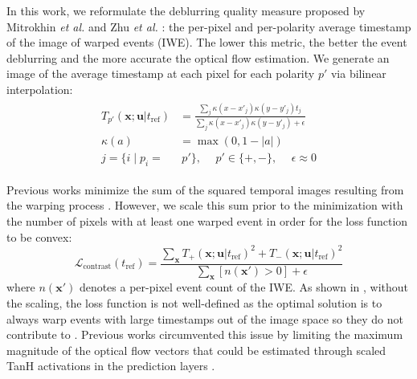 In this work, we reformulate the deblurring quality measure proposed by Mitrokhin \textit{et al.} \cite{mitrokhin2018eventbased} and Zhu \textit{et al.} \cite{zhu2019unsupervised}: the per-pixel and per-polarity average timestamp of the image of warped events (IWE). The lower this metric, the better the event deblurring and the more accurate the optical flow estimation. We generate an image of the average timestamp at each pixel for each polarity $p'$ via bilinear interpolation:
\begin{align}\label{eq:neurips_timeimage}
	\begin{aligned}
		T_{p'}(\boldsymbol{x}{;}\boldsymbol{u} |t_{\text{ref}}) &= \frac{\sum_{j} \kappa(x - x'_{j})\kappa(y - y'_{j})t_{j}}{\sum_{j} \kappa(x - x'_{j})\kappa(y - y'_{j})+\epsilon}\\\kappa(a) &= \max(0, 1-|a|)\\
		j = \{i \mid p_{i}=&\ p'\}, \hspace{15pt}p'\in\{+,-\}, \hspace{15pt} \epsilon\approx 0
	\end{aligned}
\end{align}

Previous works minimize the sum of the squared temporal images resulting from the warping process \cite{paredes-valles2021back,zhu2019unsupervised}. However, we scale this sum prior to the minimization with the number of pixels with at least one warped event in order for the loss function to be convex:
\begin{equation}\label{eq:neurips_scaling}
	\mathcal{L}_{\text{contrast}}(t_{\text{ref}}) = \frac{\sum_{\boldsymbol{x}} T_{+}(\boldsymbol{x}{;}\boldsymbol{u} |t_{\text{ref}})^2 + T_{-}(\boldsymbol{x}{;}\boldsymbol{u} |t_{\text{ref}})^2}{\sum_{\boldsymbol{x}}\left[n(\boldsymbol{x}') > 0\right] + \epsilon}
\end{equation}
where $n(\boldsymbol{x}')$ denotes a per-pixel event count of the IWE. As shown in , without the scaling, the loss function is not well-defined as the optimal solution is to always warp events with large timestamps out of the image space so they do not contribute to 
. Previous works circumvented this issue by limiting the maximum magnitude of the optical flow vectors that could be estimated through scaled TanH activations in the prediction layers \cite{paredes-valles2021back,zhu2019unsupervised}.

